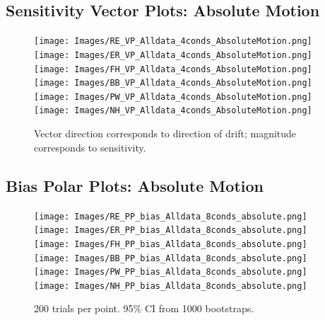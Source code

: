 \documentclass[11pt]{article} %
\begin{document}
\subsection{Sensitivity Vector Plots: Absolute Motion}
\begin{figure}[H]
\centering %
\texttt{[image: Images/RE\_VP\_Alldata\_4conds\_AbsoluteMotion.png]}
\texttt{[image: Images/ER\_VP\_Alldata\_4conds\_AbsoluteMotion.png]}
\texttt{[image: Images/FH\_VP\_Alldata\_4conds\_AbsoluteMotion.png]}
\texttt{[image: Images/BB\_VP\_Alldata\_4conds\_AbsoluteMotion.png]}
\texttt{[image: Images/PW\_VP\_Alldata\_4conds\_AbsoluteMotion.png]}
\texttt{[image: Images/NH\_VP\_Alldata\_4conds\_AbsoluteMotion.png]}
\caption{Vector direction corresponds to direction of drift; magnitude corresponds to sensitivity.}
\end{figure}
\subsection{Bias Polar Plots: Absolute Motion}
\begin{figure}[H]
\centering %
\texttt{[image: Images/RE\_PP\_bias\_Alldata\_8conds\_absolute.png]}
\texttt{[image: Images/ER\_PP\_bias\_Alldata\_8conds\_absolute.png]}
\texttt{[image: Images/FH\_PP\_bias\_Alldata\_8conds\_absolute.png]}
\texttt{[image: Images/BB\_PP\_bias\_Alldata\_8conds\_absolute.png]}
\texttt{[image: Images/PW\_PP\_bias\_Alldata\_8conds\_absolute.png]}
\texttt{[image: Images/NH\_PP\_bias\_Alldata\_8conds\_absolute.png]}
\caption{200 trials per point. 95\% CI from 1000 bootstraps.}
\end{figure}
\end{document}
